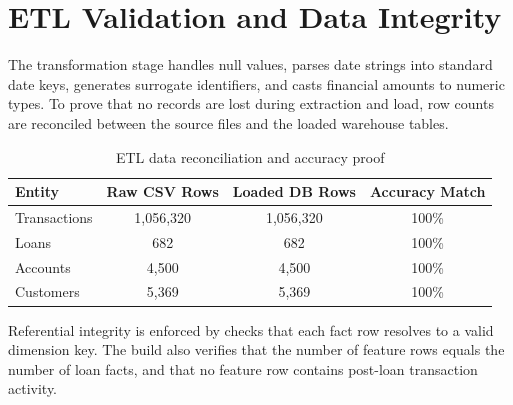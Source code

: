 \section{ETL Validation and Data Integrity}
The transformation stage handles null values, parses date strings into standard date keys, generates surrogate identifiers, and casts financial amounts to numeric types. To prove that no records are lost during extraction and load, row counts are reconciled between the source files and the loaded warehouse tables.

\begin{table}[H]
    \centering
    \begin{tabular}{|l|c|c|c|}
        \hline
        \textbf{Entity} & \textbf{Raw CSV Rows} & \textbf{Loaded DB Rows} & \textbf{Accuracy Match} \\
        \hline
        Transactions & 1,056,320 & 1,056,320 & 100\% \\
        Loans & 682 & 682 & 100\% \\
        Accounts & 4,500 & 4,500 & 100\% \\
        Customers & 5,369 & 5,369 & 100\% \\
        \hline
    \end{tabular}
    \caption{ETL data reconciliation and accuracy proof}
    \label{tab:etl_accuracy}
\end{table}

Referential integrity is enforced by checks that each fact row resolves to a valid dimension key. The build also verifies that the number of feature rows equals the number of loan facts, and that no feature row contains post-loan transaction activity.
